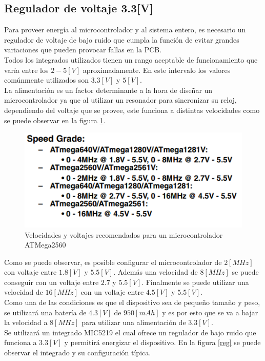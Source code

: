 \subsection{Regulador de voltaje 3.3[V]}
Para proveer energía al microcontrolador y al sistema entero, es necesario un regulador de voltaje de bajo ruido que cumpla la función de evitar grandes variaciones que pueden provocar fallas en la PCB.\\
Todos los integrados utilizados tienen un rango aceptable de funcionamiento que varía entre los $2-5[V]$ aproximadamente. En este intervalo los valores comúnmente utilizados son $3.3[V]$ y $5[V]$.\\
La alimentación es un factor determinante a la hora de diseñar un microcontrolador ya que al utilizar un resonador para sincronizar su reloj, dependiendo del voltaje que se provee, este funciona a distintas velocidades como se puede observar en la figura \ref{atmega}.\\

\begin{figure}[H]
\centering
\includegraphics[scale=0.7]{figuras/eagle/atmega.png}
\caption{Velocidades y voltajes recomendados para un microcontrolador ATMega2560}
\label{atmega}
\end{figure}

Como se puede observar, es posible configurar el microcontrolador de $2[MHz]$ con voltaje entre $1.8[V]$ y $5.5[V]$. Además una velocidad de $8[MHz]$ se puede conseguir con un voltaje entre $2.7$ y $5.5[V]$. Finalmente se puede utilizar una velocidad de $16[MHz]$ con un voltaje entre $4.5[V]$ y $5.5[V]$.\\
Como una de las condiciones es que el dispositivo sea de pequeño tamaño y peso, se utilizará una batería de $4.3[V]$ de $950[mAh]$ y es por esto que se va a bajar la velocidad a $8[MHz]$ para utilizar una alimentación de $3.3[V]$.\\

Se utilizará un integrado MIC5219 el cual ofrece un regulador de bajo ruido que funciona a $3.3[V]$ y permitirá energizar el dispositivo. En la figura \ref{reg} se puede observar el integrado y su configuración típica.

